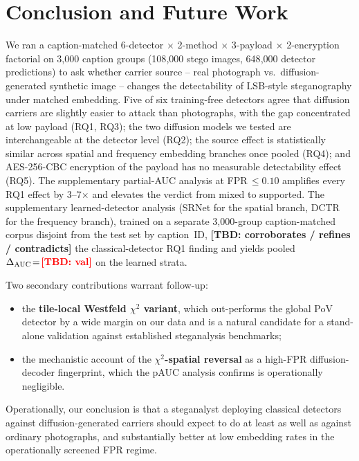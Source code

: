 \documentclass[10pt,twocolumn,a4paper]{article}
\newcommand{\TBD}[1]{\textbf{\color{red}[TBD: #1]}}
\begin{document}
\section{Conclusion and Future Work}
\label{sec:conclusion}

We ran a caption-matched 6-detector $\times$ 2-method $\times$ 3-payload $\times$ 2-encryption factorial on 3{,}000 caption groups (108{,}000 stego images, 648{,}000 detector predictions) to ask whether carrier source -- real photograph vs.\ diffusion-generated synthetic image -- changes the detectability of LSB-style steganography under matched embedding. Five of six training-free detectors agree that diffusion carriers are slightly easier to attack than photographs, with the gap concentrated at low payload (RQ1, RQ3); the two diffusion models we tested are interchangeable at the detector level (RQ2); the source effect is statistically similar across spatial and frequency embedding branches once pooled (RQ4); and AES-256-CBC encryption of the payload has no measurable detectability effect (RQ5). The supplementary partial-AUC analysis at FPR\,$\leq\!0.10$ amplifies every RQ1 effect by 3--7$\times$ and elevates the verdict from mixed to supported. The supplementary learned-detector analysis (SRNet for the spatial branch, DCTR for the frequency branch), trained on a separate 3{,}000-group caption-matched corpus disjoint from the test set by caption~ID, \TBD{corroborates / refines / contradicts} the classical-detector RQ1 finding and yields pooled $\Delta_\text{AUC}\!=\!\TBD{val}$ on the learned strata.

Two secondary contributions warrant follow-up:
\begin{itemize}
\item the \textbf{tile-local Westfeld $\chi^2$ variant}, which out-performs the global PoV detector by a wide margin on our data and is a natural candidate for a stand-alone validation against established steganalysis benchmarks;
\item the mechanistic account of the \textbf{$\chi^2$-spatial reversal} as a high-FPR diffusion-decoder fingerprint, which the pAUC analysis confirms is operationally negligible.
\end{itemize}

Operationally, our conclusion is that a steganalyst deploying classical detectors against diffusion-generated carriers should expect to do at least as well as against ordinary photographs, and substantially better at low embedding rates in the operationally screened FPR regime.
\end{document}
